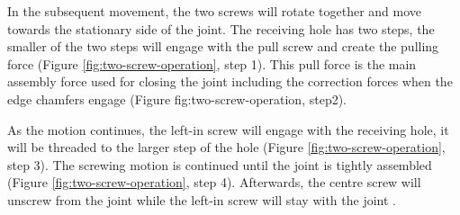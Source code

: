 In the subsequent movement, the two screws will rotate together and move towards the stationary side of the joint. The receiving hole has two steps, the smaller of the two steps will engage with the pull screw and create the pulling force (Figure \ref{fig:two-screw-operation}, step 1). This pull force is the main assembly force used for closing the joint including the correction forces when the edge chamfers engage (Figure {fig:two-screw-operation}, step2).

As the motion continues, the left-in screw will engage with the receiving hole, it will be threaded to the larger step of the hole (Figure \ref{fig:two-screw-operation}, step 3). The screwing motion is continued until the joint is tightly assembled (Figure \ref{fig:two-screw-operation}, step 4). Afterwards, the centre screw will unscrew from the joint while the left-in screw will stay with the joint .

